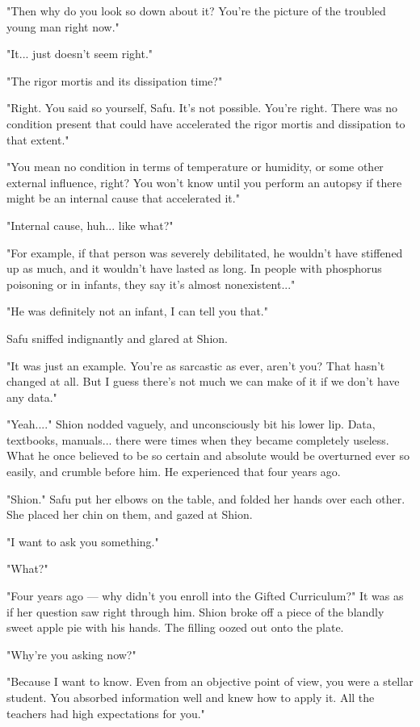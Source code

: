 "Then why do you look so down about it? You're the picture of the
troubled young man right now."

"It... just doesn't seem right."

"The rigor mortis and its dissipation time?"

"Right. You said so yourself, Safu. It's not possible. You're right.
There was no condition present that could have accelerated the rigor
mortis and dissipation to that extent."

"You mean no condition in terms of temperature or humidity, or some
other external influence, right? You won't know until you perform an
autopsy if there might be an internal cause that accelerated it."

"Internal cause, huh... like what?"

"For example, if that person was severely debilitated, he wouldn't have
stiffened up as much, and it wouldn't have lasted as long. In people
with phosphorus poisoning or in infants, they say it's almost
nonexistent..."

"He was definitely not an infant, I can tell you that."

Safu sniffed indignantly and glared at Shion.

"It was just an example. You're as sarcastic as ever, aren't you? That
hasn't changed at all. But I guess there's not much we can make of it if
we don't have any data."

"Yeah...." Shion nodded vaguely, and unconsciously bit his lower lip.
Data, textbooks, manuals... there were times when they became completely
useless. What he once believed to be so certain and absolute would be
overturned ever so easily, and crumble before him. He experienced that
four years ago.

\mybreak

"Shion." Safu put her elbows on the table, and folded her hands over
each other. She placed her chin on them, and gazed at Shion.

"I want to ask you something."

"What?"

"Four years ago --- why didn't you enroll into the Gifted Curriculum?" It
was as if her question saw right through him. Shion broke off a piece of
the blandly sweet apple pie with his hands. The filling oozed out onto
the plate.

\myspace

"Why're you asking now?"

"Because I want to know. Even from an objective point of view, you were
a stellar student. You absorbed information well and knew how to apply
it. All the teachers had high expectations for you."

